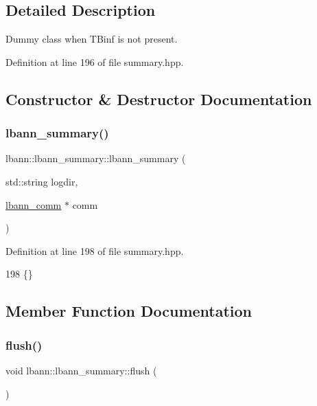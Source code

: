 \subsection{Detailed Description}
Dummy class when T\+Binf is not present. 

Definition at line 196 of file summary.\+hpp.



\subsection{Constructor \& Destructor Documentation}
\mbox{\label{classlbann_1_1lbann__summary_a2891f67b732e92cc88e2c9849f911f57}} 
\subsubsection{\texorpdfstring{lbann\+\_\+summary()}{lbann\_summary()}}
{\footnotesize\ttfamily lbann\+::lbann\+\_\+summary\+::lbann\+\_\+summary (\begin{DoxyParamCaption}\item[{std\+::string}]{logdir,  }\item[{\hyperlink{classlbann_1_1lbann__comm}{lbann\+\_\+comm} $\ast$}]{comm }\end{DoxyParamCaption})\hspace{0.3cm}{\ttfamily [inline]}}



Definition at line 198 of file summary.\+hpp.


\begin{DoxyCode}
198 \{\}
\end{DoxyCode}


\subsection{Member Function Documentation}
\mbox{\label{classlbann_1_1lbann__summary_afca72ec49f3e813b6563285a2153a5be}} 
\subsubsection{\texorpdfstring{flush()}{flush()}}
{\footnotesize\ttfamily void lbann\+::lbann\+\_\+summary\+::flush (\begin{DoxyParamCaption}{ }\end{DoxyParamCaption})\hspace{0.3cm}{\ttfamily [inline]}}



